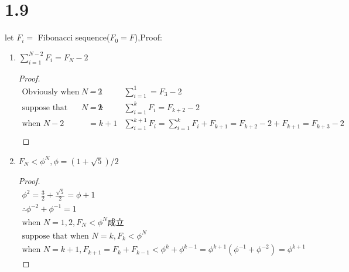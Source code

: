 \documentclass[utf8]{ctexart}
\begin{document}
\section*{1.9}
let $F_i = $ Fibonacci sequence($F_0  = F$),Proof:
\begin{enumerate}
\item $\displaystyle \sum_{i=1}^{N-2} F_i = F_N -2$
\begin{proof}
\begin{align*}
    \text{Obviously when }N-2&=1 &\sum_{i=1}^{1}  = F_3 -2 \\
\text{suppose that when }N-2 &= k &\sum_{i= 1}^{k} F_i = F_{k+2}-2\\
\text{when }N-2 & = k+1 &\sum_{i=1}^{k+1} F_i = \sum_{i=1}^{k} F_i + F_{k+1} = F_{k+2} -2  + F_{k+1} = F_{k+3} -2\\
\end{align*}
\end{proof}
\item $F_N < \phi ^N,\phi  = (1+\sqrt 5 )/2$
    \begin{proof}
    \begin{align*}
    \phi ^2 = \frac 32 + \frac{\sqrt 5 }{2} = \phi  + 1 \\ 
    \therefore \phi^{-2}+\phi^{-1}  = 1\\
    \text{when } N = 1,2, F_N < \phi ^N \text{成立} \\
    \text{suppose that when }N= k, F_k <\phi ^N\\
    \text{when }N = k+1, F_{k+1} = F_k + F_{k-1} < \phi ^k + \phi ^{k-1}  = \phi^{k+1} (\phi^{-1} + \phi^{-2}) = \phi^{k+1} 
    \end{align*}
    \end{proof}
\end{enumerate}
\end{document}
